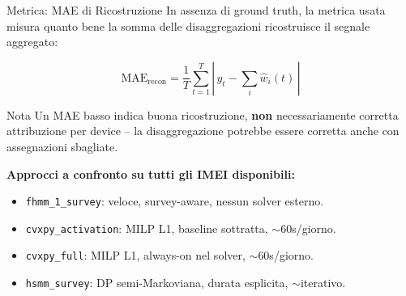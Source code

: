 \documentclass[aspectratio=169]{beamer}
\newcommand{\code}[1]{\texttt{\small #1}}
\begin{document}
\begin{frame}{Metrica: MAE di Ricostruzione}
  \small
  In assenza di ground truth, la metrica usata misura quanto bene la somma
  delle disaggregazioni ricostruisce il segnale aggregato:

  \[
    \mathrm{MAE}_{\mathrm{recon}} = \frac{1}{T}\sum_{t=1}^{T}
    \left|\, y_t - \sum_i \hat{w}_i(t) \,\right|
  \]

  \begin{block}{Nota}
    Un MAE basso indica buona ricostruzione, \textbf{non} necessariamente
    corretta attribuzione per device -- la disaggregazione potrebbe essere
    corretta anche con assegnazioni sbagliate.
  \end{block}

  \vspace{0.4em}
  \textbf{Approcci a confronto su tutti gli IMEI disponibili:}
  \begin{itemize}
    \item \code{fhmm\_1\_survey}: veloce, survey-aware, nessun solver esterno.
    \item \code{cvxpy\_activation}: MILP L1, baseline sottratta, $\sim$60s/giorno.
    \item \code{cvxpy\_full}: MILP L1, always-on nel solver, $\sim$60s/giorno.
    \item \code{hsmm\_survey}: DP semi-Markoviana, durata esplicita, $\sim$iterativo.
  \end{itemize}
\end{frame}
\end{document}
